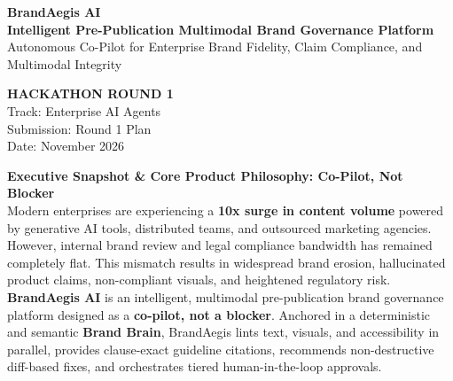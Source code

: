 \documentclass[10pt,a4paper]{article}
\begin{document}
\color{textdark}


\begin{tcolorbox}[
  enhanced,
  colback=primarydark,
  colframe=primarydark,
  arc=3mm,
  boxrule=0pt,
  left=14pt,right=14pt,top=12pt,bottom=12pt,
  shadow={0mm}{-1mm}{2mm}{black!30}
]
\begin{minipage}{0.72\textwidth}
  {\LARGE\textbf{\color{white}BrandAegis AI}}\\[3pt]
  {\large\textbf{\color{brandteal}Intelligent Pre-Publication Multimodal Brand Governance Platform}}\\[4pt]
  {\small\color{slatebg}Autonomous Co-Pilot for Enterprise Brand Fidelity, Claim Compliance, and Multimodal Integrity}
\end{minipage}
\hfill
\begin{minipage}{0.26\textwidth}
  \raggedleft
  \color{white}
  \textbf{\footnotesize HACKATHON ROUND 1}\\
  \footnotesize\color{bordergray}Track: Enterprise AI Agents\\
  \footnotesize Submission: Round 1 Plan\\
  \footnotesize Date: November 2026
\end{minipage}
\end{tcolorbox}

\vspace{0.15cm}

\begin{calloutbox}[brandblue]
  \textbf{\color{brandblue}Executive Snapshot \& Core Product Philosophy: Co-Pilot, Not Blocker}\\[2pt]
  \small Modern enterprises are experiencing a \textbf{10x surge in content volume} powered by generative AI tools, distributed teams, and outsourced marketing agencies. However, internal brand review and legal compliance bandwidth has remained completely flat. This mismatch results in widespread brand erosion, hallucinated product claims, non-compliant visuals, and heightened regulatory risk. \textbf{BrandAegis AI} is an intelligent, multimodal pre-publication brand governance platform designed as a \textbf{co-pilot, not a blocker}. Anchored in a deterministic and semantic \textbf{Brand Brain}, BrandAegis lints text, visuals, and accessibility in parallel, provides clause-exact guideline citations, recommends non-destructive diff-based fixes, and orchestrates tiered human-in-the-loop approvals.
\end{calloutbox}
\end{document}
